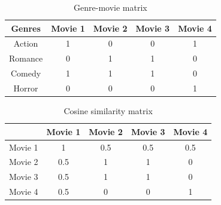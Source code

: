 \begin{table}[h]
    \centering
    \begin{tabular}{|c|c|c|c|c|}
        \hline
        \textbf{Genres} & \textbf{Movie 1} & \textbf{Movie 2} & \textbf{Movie 3} & \textbf{Movie 4} \\        
        \hline
        Action  & 1 & 0 & 0 & 1\\
        \hline
        Romance & 0 & 1 & 1 & 0\\
        \hline
        Comedy  & 1 & 1 & 1 & 0\\
        \hline
        Horror  & 0 & 0 & 0 & 1\\
        \hline
    \end{tabular}
    \caption{Genre-movie matrix}\label{tab:genre_movie_matrix}
\end{table}

\newcommand{\cosinesimilarity}{%
    \begin{equation}
    \text{similarity} = \cos(\theta) = \frac{\vec{A} \cdot \vec{B}}{||\vec{A}|| \times ||\vec{B}||} = \frac{\sum_{i=1}^{n} A_i B_i}{\sqrt{\sum_{i=1}^{n} A_i^2} \times \sqrt{\sum_{i=1}^{n} B_i^2}}
    \end{equation}
}
\begin{table}[h]
    \centering
    \begin{tabular}{|c|c|c|c|c|}
        \hline
         & Movie 1 & Movie 2 & Movie 3 & Movie 4 \\        
        \hline
        Movie 1 &1		&0.5	&0.5	&0.5\\
        \hline	
        Movie 2 &0.5	&1      &1		&0	\\
        \hline
        Movie 3 &0.5	&1		&1		&0	\\
        \hline
        Movie 4 &0.5	&0		&0		&1	\\
        \hline
    \end{tabular}
    \caption{Cosine similarity matrix}\label{tab:cosine_similarity_matrix}
\end{table}